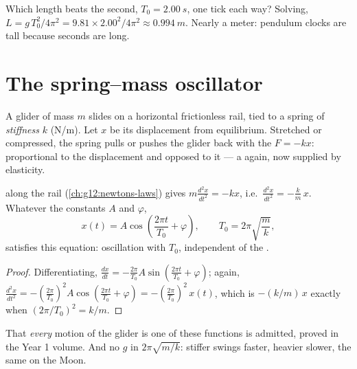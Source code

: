 \begin{example}\label{ex:g12:oscillators-and-time:seconds}
Which length beats the second, $T_0 = \qty{2.00}{s}$, one tick each
way? Solving, $L = g\,T_0^2/4\pi^2 = 9.81 \times 2.00^2/4\pi^2 \approx
\qty{0.994}{m}$. Nearly a meter: pendulum clocks are tall because
seconds are long.
\end{example}

\section{The spring--mass oscillator}

\begin{definition}\label{def:g12:oscillators-and-time:spring}
A glider of mass $m$ slides on a horizontal frictionless rail, tied to
a spring of \emph{stiffness} $k$ (\unit{N/m}). Let
$x$ be its displacement from equilibrium. Stretched or compressed, the
spring pulls or pushes the glider back with the  $F = -kx$:
proportional to the displacement and opposed to it --- a  again, now supplied by elasticity.
\end{definition}

\begin{proposition}\label{prop:g12:oscillators-and-time:spring-period}
 along the rail (\cref{ch:g12:newtons-laws}) gives
$m \frac{d^2x}{dt^2} = -kx$, i.e.\ $\frac{d^2x}{dt^2} =
-\frac{k}{m}\,x$. Whatever the constants $A$ and $\varphi$,
\[
x(t) = A \cos\!\left(\frac{2\pi t}{T_0} + \varphi\right),
\qquad T_0 = 2\pi\sqrt{\frac{m}{k}},
\]
satisfies this equation: oscillation with  $T_0$, independent
of the .
\end{proposition}

\begin{proof}
Differentiating, $\frac{dx}{dt} = -\frac{2\pi}{T_0}A \sin(\frac{2\pi
t}{T_0} + \varphi)$; again, $\frac{d^2x}{dt^2} = -(\frac{2\pi}{T_0})^2
A\cos(\frac{2\pi t}{T_0} + \varphi) = -(\frac{2\pi}{T_0})^2\,x(t)$,
which is $-(k/m)\,x$ exactly when $(2\pi/T_0)^2 = k/m$.
\end{proof}

\begin{remark}\label{rem:g12:oscillators-and-time:uniqueness}
That \emph{every} motion of the glider is one of these functions is
admitted, proved in the Year 1 volume. And no $g$ in $2\pi\sqrt{m/k}$:
stiffer swings faster, heavier slower, the same on the Moon.
\end{remark}

